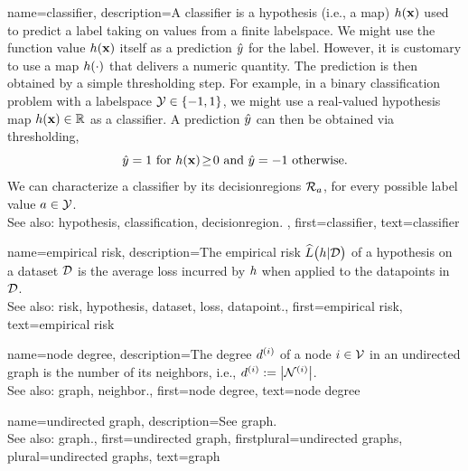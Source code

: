 {name={classifier},
	description={A classifier is a \gls{hypothesis} (i.e., a \gls{map}) $h({\bf x})$ 
		used to predict a \gls{label} taking on values from a finite \gls{labelspace}. We might use the 
		\gls{function} value $h({\bf x})$ itself as a \gls{prediction} $\hat{y}$ for 
		the \gls{label}. However, it is customary to use a \gls{map} $h(\cdot)$ that delivers 
		a numeric quantity. The \gls{prediction} is then obtained by a simple thresholding step. 
		For example, in a binary \gls{classification} problem with a \gls{labelspace} $\mathcal{Y} \in  \{ -1,1\}$, 
		we might use a real-valued \gls{hypothesis} \gls{map} $h({\bf x}) \in \mathbb{R}$ 
		as a classifier. A \gls{prediction} $\hat{y}$ can then be obtained via thresholding,  
		 \begin{equation} 
		 	\label{equ_def_threshold_bin_classifier_dict}
		 	\hat{y} =1   \mbox{ for } h({\bf x})\!\geq\!0 \mbox{ and } 	\hat{y} =-1  \mbox{ otherwise.}
	 		\end{equation}
 		We can characterize a classifier by its \glspl{decisionregion} $\mathcal{R}_{a}$, for 
 		every possible \gls{label} value $a \in \mathcal{Y}$.
					\\ 
		See also: \gls{hypothesis}, \gls{classification}, \gls{decisionregion}. },
	first={classifier},
	text={classifier} 
}

{name={empirical risk},
  description={The empirical \gls{risk} $\widehat{L}\big(h|\mathcal{D}\big)$ 
  	of a \gls{hypothesis} on a \gls{dataset} $\mathcal{D}$ is the average \gls{loss} incurred 
  	by $h$ when applied to the \glspl{datapoint} in $\mathcal{D}$.
				\\ 
		See also: \gls{risk}, \gls{hypothesis}, \gls{dataset}, \gls{loss}, \gls{datapoint}.},
  first={empirical risk},
  text={empirical risk} 
}

{name={node degree},
	description={The degree $d^{(i)}$ of a 
	node $i \in \mathcal{V}$ in an undirected \gls{graph} is the 
	number of its \glspl{neighbor}, i.e., $d^{(i)} := \big|\mathcal{N}^{(i)}\big|$.
					\\ 
		See also: \gls{graph}, \gls{neighbor}.},
	first={node degree},
	text={node degree} 
}

{name={undirected graph},
	description={See \gls{graph}. 
					\\ 
		See also: \gls{graph}.},
	first={undirected graph},
	firstplural={undirected graphs}, 
	plural={undirected graphs}, 
	text={graph} 
}

